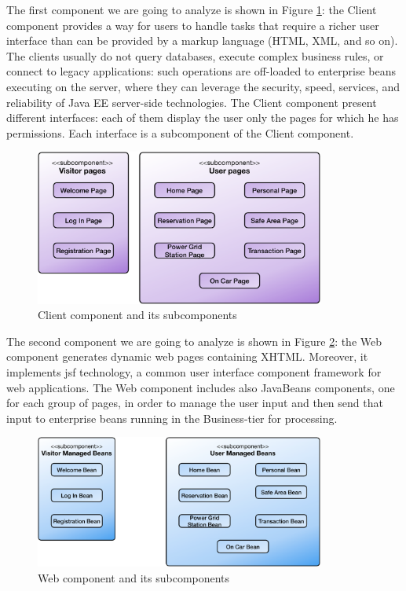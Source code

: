\newline
The first component we are going to analyze is shown in Figure \ref{fig:client}: the Client component provides a way for users to handle tasks that require a richer user interface than can be provided by a markup language (HTML, XML, and so on).
The clients usually do not query databases, execute complex business rules, or connect to legacy applications: such operations are off-loaded to enterprise beans executing on the server, where they can leverage the security, speed, services, and reliability of Java EE server-side technologies.
The Client component present different interfaces: each of them display the user only the pages for which he has permissions. 
Each interface is a subcomponent of the Client component.

\vspace{52pt}
\begin{figure}[htbp]
\centering
\includegraphics[width=0.85\textwidth]{Images/ClientComponent.pdf}
\vspace{10pt}
\caption{Client component and its subcomponents}
\label{fig:client}
\end{figure}
\clearpage

\newline
The second component we are going to analyze is shown in Figure \ref{fig:web}: the Web component generates dynamic web pages containing XHTML. Moreover, it implements \acl{jsf} technology, a common user interface component framework for web applications.
The Web component includes also JavaBeans components, one for each group of pages, in order to manage the user input and then send that input to enterprise beans running in the Business-tier for processing.

\vspace{104pt}
\begin{figure}[htbp]
\centering
\includegraphics[width=0.85\textwidth]{Images/WebComponent.pdf}
\vspace{10pt}
\caption{Web component and its subcomponents}
\label{fig:web}
\end{figure}
\clearpage

